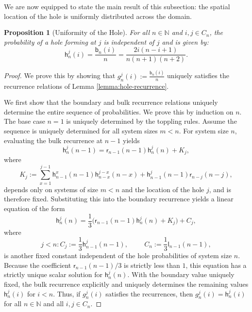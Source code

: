 \documentclass[11pt]{article}
\newtheorem{proposition}{Proposition}[section]
\newcommand{\N}{\mathbb{N}}
\newcommand{\sgrleft}[2]{\mathsf{l}_{#1}(#2)}
\newcommand{\sgrright}[2]{\mathsf{r}_{#1}(#2)}
\newcommand{\sgrboth}[2]{\mathsf{b}_{#1}(#2)}
\begin{document}
We are now equipped to state the main result of this subsection: the spatial location of the hole is uniformly distributed across the domain.

\begin{proposition}[Uniformity of the Hole]\label{prop:hole-uniformity}
    For all $n \in \N$ and $i, j \in C_n$, the probability of a hole forming at $j$ is independent of $j$ and is given by:
    \begin{equation*}
        \mathsf{h}_n^j(i) = \frac{\sgrboth{n}{i}}{n} = \frac{2i(n-i+1)}{n(n+1)(n+2)}.
    \end{equation*}
\end{proposition}

\begin{proof}
    We prove this by showing that $g_n^j(i) := \frac{\sgrboth{n}{i}}{n}$ uniquely satisfies the recurrence relations of Lemma \ref{lemma:hole-recurrence}.
    
     We first show that the boundary and bulk recurrence relations uniquely determine the entire sequence of probabilities. We prove this by induction on $n$. The base case $n=1$ is uniquely determined by the toppling rules. Assume the sequence is uniquely determined for all system sizes $m < n$. For system size $n$, evaluating the bulk recurrence at $n-1$ yields $$\mathsf{h}_n^j(n-1) = \sgrright{n-1}{n-1}\mathsf{h}_n^j(n) + K_j,$$ where 
     $$K_j:=\sum_{x=1}^{j-1} \mathsf{h}_{n-1}^x(n-1)\mathsf{h}_{n-x}^{j-x}(n-x) + \mathsf{h}_{n-1}^j(n-1)\sgrright{n-j}{n-j},$$
     depends only on systems of size $m < n$ and the location of the hole $j$, and is therefore fixed. Substituting this into the boundary recurrence yields a linear equation of the form
    $$ \mathsf{h}_n^j(n) = \frac{1}{3} \Big( \sgrright{n-1}{n-1}\mathsf{h}_n^j(n) + K_j \Big) + C_j, $$
    where
    $$j<n:C_j:=\frac{1}{3}\mathsf{h}_{n-1}^j(n-1),\hspace{1cm}C_n:=\frac{1}{3}\sgrleft{n-1}{n-1},$$
    is another fixed constant independent of the hole probabilities of system size $n$. Because the coefficient $\sgrright{n-1}{n-1}/3$ is strictly less than $1$, this equation has a strictly unique scalar solution for $\mathsf{h}_n^j(n)$. With the boundary value uniquely fixed, the bulk recurrence explicitly and uniquely determines the remaining values $\mathsf{h}_n^j(i)$ for $i < n$. Thus, if $g_n^j(i)$ satisfies the recurrences, then $g_n^j(i)= \mathsf{h}_n^j(i)$ for all $n\in\N$ and all $i,j\in C_n$.
    

\end{proof}
\end{document}

